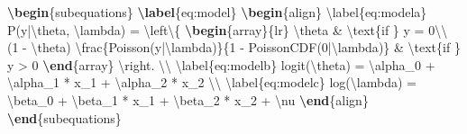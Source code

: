 \documentclass[review]{elsarticle} %
\newenvironment{Shaded}{\begin{snugshade}}{\end{snugshade}}
\newcommand{\KeywordTok}[1]{\textcolor[rgb]{0.13,0.29,0.53}{\textbf{#1}}}
\newcommand{\SpecialCharTok}[1]{\textcolor[rgb]{0.00,0.00,0.00}{#1}}
\newcommand{\SpecialStringTok}[1]{\textcolor[rgb]{0.31,0.60,0.02}{#1}}
\newcommand{\ExtensionTok}[1]{#1}
\newcommand{\NormalTok}[1]{#1}
\begin{document}
\begin{Shaded}
\begin{Highlighting}[]
\KeywordTok{\textbackslash{}begin}\NormalTok{\{}\ExtensionTok{subequations}\NormalTok{\}}
  \KeywordTok{\textbackslash{}label}\NormalTok{\{}\ExtensionTok{eq:model}\NormalTok{\}}
  \KeywordTok{\textbackslash{}begin}\NormalTok{\{}\ExtensionTok{align}\NormalTok{\}}
\SpecialStringTok{  }\SpecialCharTok{\textbackslash{}label}\SpecialStringTok{\{eq:modela\}}
\SpecialStringTok{P(y|}\SpecialCharTok{\textbackslash{}theta}\SpecialStringTok{, }\SpecialCharTok{\textbackslash{}lambda}\SpecialStringTok{) = }
\SpecialCharTok{\textbackslash{}left\textbackslash{}\{}
\SpecialStringTok{    }\KeywordTok{\textbackslash{}begin}\NormalTok{\{}\ExtensionTok{array}\NormalTok{\}}\SpecialStringTok{\{lr\}}
\SpecialStringTok{       }\SpecialCharTok{\textbackslash{}theta}\SpecialStringTok{ & }\SpecialCharTok{\textbackslash{}text}\NormalTok{\{if \}}\SpecialStringTok{ y = 0}\SpecialCharTok{\textbackslash{}\textbackslash{}}
\SpecialStringTok{       (1 - }\SpecialCharTok{\textbackslash{}theta}\SpecialStringTok{) }\SpecialCharTok{\textbackslash{}frac}\SpecialStringTok{\{Poisson(y|}\SpecialCharTok{\textbackslash{}lambda}\SpecialStringTok{)\}\{1 - PoissonCDF(0|}\SpecialCharTok{\textbackslash{}lambda}\SpecialStringTok{)\} }
\SpecialStringTok{       & }\SpecialCharTok{\textbackslash{}text}\NormalTok{\{if \}}\SpecialStringTok{ y > 0}
\SpecialStringTok{    }\KeywordTok{\textbackslash{}end}\NormalTok{\{}\SpecialStringTok{array\}}
\SpecialCharTok{\textbackslash{}right}\SpecialStringTok{. }\SpecialCharTok{\textbackslash{}\textbackslash{}}
\SpecialStringTok{  }\SpecialCharTok{\textbackslash{}label}\SpecialStringTok{\{eq:modelb\}}
\SpecialStringTok{logit(}\SpecialCharTok{\textbackslash{}theta}\SpecialStringTok{) = }\SpecialCharTok{\textbackslash{}alpha}\SpecialStringTok{_0 + }\SpecialCharTok{\textbackslash{}alpha}\SpecialStringTok{_1 * x_1 + }\SpecialCharTok{\textbackslash{}alpha}\SpecialStringTok{_2 * x_2 }\SpecialCharTok{\textbackslash{}\textbackslash{}}
\SpecialStringTok{  }\SpecialCharTok{\textbackslash{}label}\SpecialStringTok{\{eq:modelc\}}
\SpecialStringTok{log(}\SpecialCharTok{\textbackslash{}lambda}\SpecialStringTok{) = }\SpecialCharTok{\textbackslash{}beta}\SpecialStringTok{_0 + }\SpecialCharTok{\textbackslash{}beta}\SpecialStringTok{_1 * x_1 + }\SpecialCharTok{\textbackslash{}beta}\SpecialStringTok{_2 * x_2 + }\SpecialCharTok{\textbackslash{}nu}
\SpecialStringTok{  }\KeywordTok{\textbackslash{}end}\NormalTok{\{}\ExtensionTok{align}\NormalTok{\}}
\KeywordTok{\textbackslash{}end}\NormalTok{\{}\ExtensionTok{subequations}\NormalTok{\}}
\end{Highlighting}
\end{Shaded}
\end{document}

